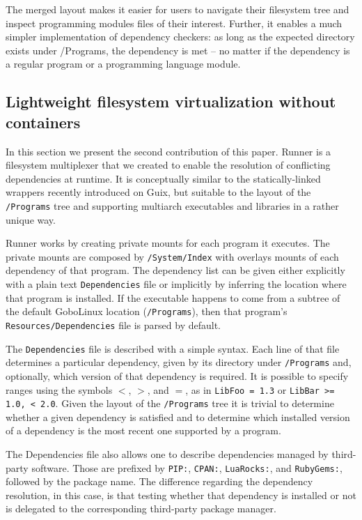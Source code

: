 \documentclass[sigplan, anonymous, 10pt]{acmart}
\begin{document}
The merged layout makes it easier for users to navigate their filesystem tree
and inspect programming modules files of their interest. Further, it enables a
much simpler implementation of dependency checkers: as long as the expected
directory exists under /Programs, the dependency is met -- no matter if the
dependency is a regular program or a programming language module.

\subsection{Lightweight filesystem virtualization without containers}
In this section we present the second contribution of this paper. Runner is a
filesystem multiplexer that we created to enable the resolution of conflicting
dependencies at runtime. It is conceptually similar to the statically-linked
wrappers recently introduced on Guix, but suitable to the layout of the
\texttt{/Programs} tree and supporting multiarch executables and libraries
in a rather unique way.

Runner works by creating private mounts for each program it executes. The
private mounts are composed by \texttt{/Sys\-tem/Index} with overlays mounts
of each dependency of that program. The dependency list can be given either
explicitly with a plain text \texttt{Dependencies} file or implicitly by
inferring the location where that program is installed. If the executable
happens to come from a subtree of  the default GoboLinux location
(\texttt{/Programs}), then that program's \texttt{Resources/Dependencies}
file is parsed by default.

The \texttt{Dependencies} file is described with a simple syntax. Each line of that file determines
a particular dependency, given by its directory under \texttt{/Programs} and, optionally,
which version of that dependency is required. It is possible to specify ranges using the
symbols $<$, $>$, and $=$, as in \texttt{LibFoo = 1.3} or \texttt{LibBar >= 1.0, < 2.0}.
Given the layout of the \texttt{/Programs} tree it is trivial to determine whether a given
dependency is satisfied and to determine which installed version of a dependency is the most
recent one supported by a program.

The Dependencies file also allows one to describe dependencies managed by third-party
software. Those are prefixed by \texttt{PIP:}, \texttt{CPAN:}, \texttt{LuaRocks:}, and
\texttt{RubyGems:}, followed by the package name. The difference regarding the dependency
resolution, in this case, is that testing whether that dependency is installed or not is
delegated to the corresponding third-party package manager.
\end{document}
